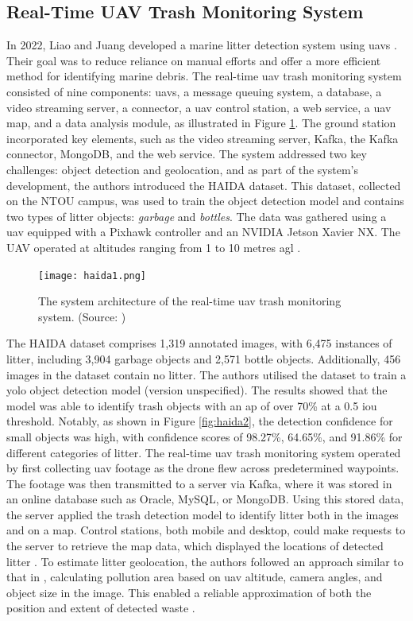 \subsection{Real-Time UAV Trash Monitoring System}
\label{subsec:3_haida}

In 2022, Liao and Juang developed a marine litter detection system using \glspl{uav} \cite{haida}. Their goal was to reduce reliance on manual efforts and offer a more efficient method for identifying marine debris. The real-time \gls{uav} trash monitoring system consisted of nine components: \glspl{uav}, a message queuing system, a database, a video streaming server, a connector, a \gls{uav} control station, a web service, a \gls{uav} map, and a data analysis module, as illustrated in Figure \ref{fig:haida1}. The ground station incorporated key elements, such as the video streaming server, Kafka, the Kafka connector, MongoDB, and the web service. The system addressed two key challenges: object detection and geolocation, and as part of the system's development, the authors introduced the HAIDA dataset. This dataset, collected on the NTOU campus, was used to train the object detection model and contains two types of litter objects: \textit{garbage} and \textit{bottles}. The data was gathered using a \gls{uav} equipped with a Pixhawk controller and an NVIDIA Jetson Xavier NX. The UAV operated at altitudes ranging from 1 to 10 metres \gls{agl} \cite{haida}.

\begin{figure}[!htbp]
    \centering
    \texttt{[image: haida1.png]}
    \caption{The system architecture of the real-time \gls{uav} trash monitoring system. (Source: \cite{haida})}
    \label{fig:haida1}
\end{figure}

The HAIDA dataset comprises 1,319 annotated images, with 6,475 instances of litter, including 3,904 garbage objects and 2,571 bottle objects. Additionally, 456 images in the dataset contain no litter. The authors utilised the dataset to train a \gls{yolo} object detection model (version unspecified). The results showed that the model was able to identify trash objects with an \gls{ap} of over 70\% at a 0.5 \gls{iou} threshold. Notably, as shown in Figure \ref{fig:haida2}, the detection confidence for small objects was high, with confidence scores of 98.27\%, 64.65\%, and 91.86\% for different categories of litter.
The real-time \gls{uav} trash monitoring system operated by first collecting \gls{uav} footage as the drone flew across predetermined waypoints. The footage was then transmitted to a server via Kafka, where it was stored in an online database such as Oracle, MySQL, or MongoDB. Using this stored data, the server applied the trash detection model to identify litter both in the images and on a map. Control stations, both mobile and desktop, could make requests to the server to retrieve the map data, which displayed the locations of detected litter \cite{haida}.
To estimate litter geolocation, the authors followed an approach similar to that in \cite{uavvaste}, calculating pollution area based on \gls{uav} altitude, camera angles, and object size in the image. This enabled a reliable approximation of both the position and extent of detected waste \cite{haida}.

